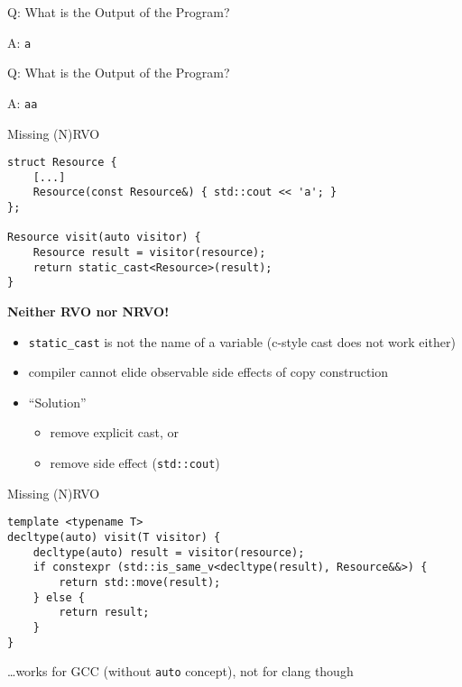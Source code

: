 \documentclass[compress,aspectratio=1610]{beamer}
\newcommand{\inputcpplisting}[1]{}
\begin{document}
\begin{frame}
    \centering
    \scalebox{5.}{\color{vertexDarkRed}$*$}
\end{frame}

\begin{frame}[fragile]{Q: What is the Output of the Program?}
    \inputcpplisting{snippet16a}
\end{frame}

\begin{frame}[fragile]{A: \texttt{a}}
    \inputcpplisting{snippet16a}
\end{frame}

\begin{frame}[fragile]{Q: What is the Output of the Program?}
    \inputcpplisting{snippet16b}
\end{frame}

\begin{frame}[fragile]{A: \texttt{aa}}
    \inputcpplisting{snippet16b}
\end{frame}

\begin{frame}[fragile]{Missing (N)RVO}
    \begin{lstlisting}
struct Resource {
    [...]
    Resource(const Resource&) { std::cout << 'a'; }
};

Resource visit(auto visitor) {
    Resource result = visitor(resource);
    return static_cast<Resource>(result);
}
    \end{lstlisting}

    \textbf{Neither RVO nor NRVO!}
    \begin{itemize}
        \item \texttt{static\_cast} is not the name of a variable (c-style cast does not work either)
        \item compiler cannot elide observable side effects of copy construction
        \item \enquote{Solution}
        \begin{itemize}
            \item remove explicit cast, or
            \item remove side effect (\texttt{std::cout})
        \end{itemize}
    \end{itemize}
\end{frame}

\begin{frame}[fragile]{Missing (N)RVO}
    \begin{lstlisting}
template <typename T>
decltype(auto) visit(T visitor) {
    decltype(auto) result = visitor(resource);
    if constexpr (std::is_same_v<decltype(result), Resource&&>) {
        return std::move(result);
    } else {
        return result;
    }
}
    \end{lstlisting}

    \hfill \ldots works for GCC (without \texttt{auto} concept), not for clang though
\end{frame}
\end{document}
